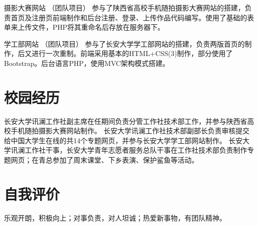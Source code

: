 \documentclass[11pt,a4paper]{moderncv}
\begin{document}
{摄影大赛网站 （团队项目）}
{}
{}{}
{参与了陕西省高校手机随拍摄影大赛网站的搭建，负责首页及注册页前端制作和后台注册、登录、上传作品代码编写。使用了基础的表单来上传文件，PHP将其重命名后存放在服务器下。}

{学工部网站 （团队项目）}
{}
{}{}
{参与了长安大学学工部网站的搭建，负责两版首页的制作，后又进行一次重制。前端采用基本的HTML+CSS(3)制作，部分使用了Bootstrap。后台语言PHP，使用MVC架构模式搭建。}

\section{校园经历} %
{长安大学讯澜工作社副主席}{}{}{}{在任期间负责分管工作社技术部工作，并参与陕西省高校手机随拍摄影大赛网站制作。}
{长安大学讯澜工作社技术部副部长}{}{}{}{负责审核提交给中国大学生在线的共14个专题网页，并参与长安大学学工部网站制作。}
{长安大学讯澜工作社干事，长安大学青年志愿者服务总队干事}{}{}{}{在工作社技术部负责制作专题网页；在青总参加了周末课堂、下乡表演、保护鲨鱼等活动。}

\section{自我评价} %
\cventry{}
{乐观开朗，积极向上；对事负责，对人坦诚；热爱新事物，有团队精神。}{}{}{}{}

\closesection{}                   %
%

\end{document}
